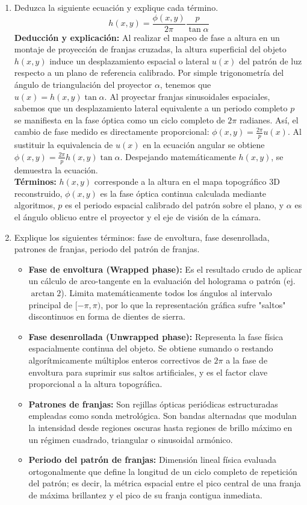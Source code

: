 \documentclass[12pt,a4paper]{article}
\begin{document}
\begin{enumerate}
		\item Deduzca la siguiente ecuación y explique cada término.
		\[ h(x,y) = \frac{\phi(x,y)}{2\pi} \frac{p}{\tan \alpha} \]
		\textbf{Deducción y explicación:} Al realizar el mapeo de fase a altura en un montaje de proyección de franjas cruzadas, la altura superficial del objeto $h(x,y)$ induce un desplazamiento espacial o lateral $u(x)$ del patrón de luz respecto a un plano de referencia calibrado. Por simple trigonometría del ángulo de triangulación del proyector $\alpha$, tenemos que $u(x) = h(x,y) \tan \alpha$. Al proyectar franjas sinusoidales espaciales, sabemos que un desplazamiento lateral equivalente a un periodo completo $p$ se manifiesta en la fase óptica como un ciclo completo de $2\pi$ radianes. Así, el cambio de fase medido es directamente proporcional: $\phi(x,y) = \frac{2\pi}{p} u(x)$. Al sustituir la equivalencia de $u(x)$ en la ecuación angular se obtiene $\phi(x,y) = \frac{2\pi}{p} h(x,y) \tan \alpha$. Despejando matemáticamente $h(x,y)$, se demuestra la ecuación.\\
		\textbf{Términos:} $h(x,y)$ corresponde a la altura en el mapa topográfico 3D reconstruido, $\phi(x,y)$ es la fase óptica continua calculada mediante algoritmos, $p$ es el periodo espacial calibrado del patrón sobre el plano, y $\alpha$ es el ángulo oblicuo entre el proyector y el eje de visión de la cámara.
		
		\item Explique los siguientes términos: fase de envoltura, fase desenrollada, patrones de franjas, periodo del patrón de franjas.
		\begin{itemize}
			\item \textbf{Fase de envoltura (Wrapped phase):} Es el resultado crudo de aplicar un cálculo de arco-tangente en la evaluación del holograma o patrón (ej. $\arctan2$). Limita matemáticamente todos los ángulos al intervalo principal de $[-\pi, \pi)$, por lo que la representación gráfica sufre "saltos" discontinuos en forma de dientes de sierra.
			\item \textbf{Fase desenrollada (Unwrapped phase):} Representa la fase física espacialmente continua del objeto. Se obtiene sumando o restando algorítmicamente múltiplos enteros correctivos de $2\pi$ a la fase de envoltura para suprimir sus saltos artificiales, y es el factor clave proporcional a la altura topográfica.
			\item \textbf{Patrones de franjas:} Son rejillas ópticas periódicas estructuradas empleadas como sonda metrológica. Son bandas alternadas que modulan la intensidad desde regiones oscuras hasta regiones de brillo máximo en un régimen cuadrado, triangular o sinusoidal armónico.
			\item \textbf{Periodo del patrón de franjas:} Dimensión lineal física evaluada ortogonalmente que define la longitud de un ciclo completo de repetición del patrón; es decir, la métrica espacial entre el pico central de una franja de máxima brillantez y el pico de su franja contigua inmediata.
		\end{itemize}
		

\end{enumerate}
\end{document}
